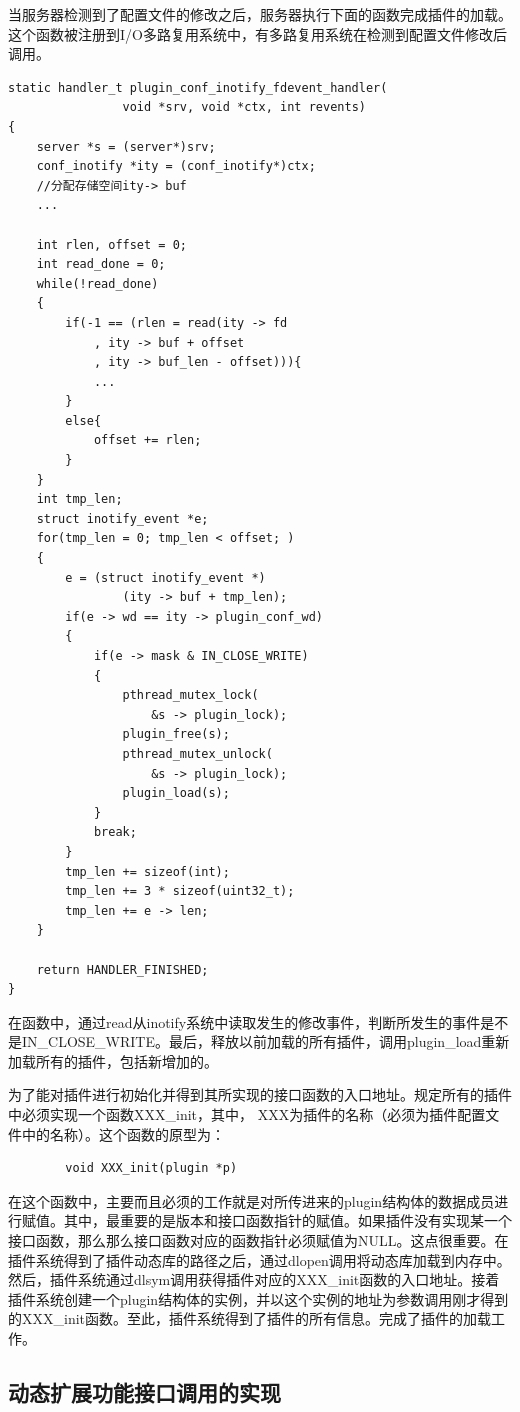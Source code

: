 \documentclass[twoside, xetex]{report}
\begin{document}
	当服务器检测到了配置文件的修改之后，服务器执行下面的函数完成插件的加载。这个函数被注册到I/O多路复用系统中，有多路复用系统在检测到配置文件修改后调用。
	
	\begin{verbatim}
static handler_t plugin_conf_inotify_fdevent_handler(
				void *srv, void *ctx, int revents)
{
	server *s = (server*)srv;
	conf_inotify *ity = (conf_inotify*)ctx;
	//分配存储空间ity-> buf
	...
	
	int rlen, offset = 0;
	int read_done = 0;
	while(!read_done)
	{
		if(-1 == (rlen = read(ity -> fd
			, ity -> buf + offset
			, ity -> buf_len - offset))){
			...
		}
		else{
			offset += rlen;
		}
	}
	int tmp_len;
	struct inotify_event *e;
	for(tmp_len = 0; tmp_len < offset; )
	{
		e = (struct inotify_event *)
				(ity -> buf + tmp_len);
		if(e -> wd == ity -> plugin_conf_wd)
		{
			if(e -> mask & IN_CLOSE_WRITE)
			{
				pthread_mutex_lock(
					&s -> plugin_lock);
				plugin_free(s);
				pthread_mutex_unlock(
					&s -> plugin_lock);
				plugin_load(s);
			}
			break;
		}
		tmp_len += sizeof(int); 			
		tmp_len += 3 * sizeof(uint32_t);	
		tmp_len += e -> len;
	}
	
	return HANDLER_FINISHED;
}
	\end{verbatim}
	
	在函数中，通过read从inotify系统中读取发生的修改事件，判断所发生的事件是不是IN\_CLOSE\_WRITE。最后，释放以前加载的所有插件，调用plugin\_load重新加载所有的插件，包括新增加的。
	
	为了能对插件进行初始化并得到其所实现的接口函数的入口地址。规定所有的插件中必须实现一个函数XXX\_init，其中，	XXX为插件的名称（必须为插件配置文件中的名称）。这个函数的原型为：
	
\begin{verbatim}
        void XXX_init(plugin *p)
\end{verbatim}

	在这个函数中，主要而且必须的工作就是对所传进来的plugin结构体的数据成员进行赋值。其中，最重要的是版本和接口函数指针的赋值。如果插件没有实现某一个接口函数，那么那么接口函数对应的函数指针必须赋值为NULL。这点很重要。在插件系统得到了插件动态库的路径之后，通过dlopen调用将动态库加载到内存中。然后，插件系统通过dlsym调用获得插件对应的XXX\_init函数的入口地址。接着插件系统创建一个plugin结构体的实例，并以这个实例的地址为参数调用刚才得到的XXX\_init函数。至此，插件系统得到了插件的所有信息。完成了插件的加载工作。
	
\subsection{动态扩展功能接口调用的实现}
\end{document}
